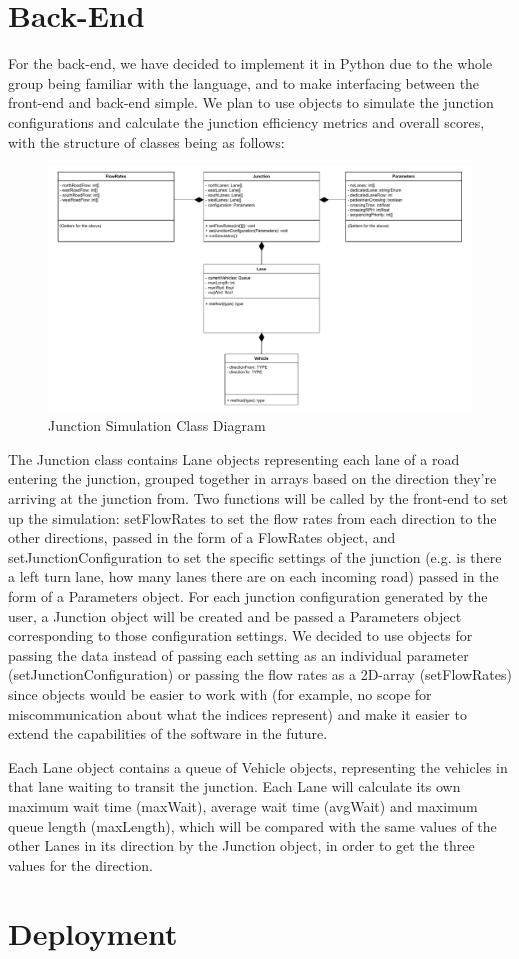 \documentclass{article}
\begin{document}
\section{Back-End}
For the back-end, we have decided to implement it in Python due to the whole group being familiar with the language, and to make 
interfacing between the front-end and back-end simple. We plan to use objects to simulate the junction configurations and calculate 
the junction efficiency metrics and overall scores, with the structure of classes being as follows:
\begin{figure}[H]
    \centering
    \includegraphics[width=0.5\linewidth]{JunctionSimulationClassDiagram.drawio.pdf}
    \caption{Junction Simulation Class Diagram}
    \label{class diagram}
\end{figure}
The Junction class contains Lane objects representing each lane of a road entering the junction, grouped together in arrays based on 
the direction they’re arriving at the junction from. Two functions will be called by the front-end to set up the simulation: setFlowRates 
to set the flow rates from each direction to the other directions, passed in the form of a FlowRates object, and setJunctionConfiguration 
to set the specific settings of the junction (e.g. is there a left turn lane, how many lanes there are on each incoming road) passed in 
the form of a Parameters object. For each junction configuration generated by the user, a Junction object will be created and be passed 
a Parameters object corresponding to those configuration settings. We decided to use objects for passing the data instead of passing each 
setting as an individual parameter (setJunctionConfiguration) or passing the flow rates as a 2D-array (setFlowRates) since objects would 
be easier to work with (for example, no scope for miscommunication about what the indices represent) and make it easier to extend the 
capabilities of the software in the future.

Each Lane object contains a queue of Vehicle objects, representing the vehicles in that lane waiting to transit the junction. Each Lane 
will calculate its own maximum wait time (maxWait), average wait time (avgWait) and maximum queue length (maxLength), which will be 
compared with the same values of the other Lanes in its direction by the Junction object, in order to get the three values for the direction.


\section{Deployment}
\end{document}
